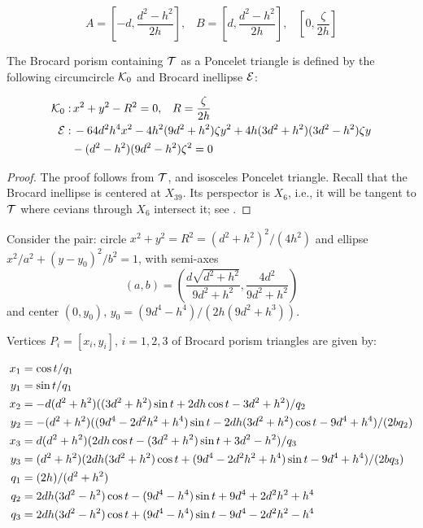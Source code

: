 \[A=\left[-d ,\frac{d^2-h^2}{2h}\right], \;\;\; B= \left[d,\frac{d^2-h^2}{2h}\right], \;\;\; \left[0 ,\frac{\zeta}{2h}\right] \]


\begin{proposition}\label{prop:pair_brocard}
The Brocard porism containing $\mathcal{T}$ as a Poncelet triangle is defined by the following circumcircle $\mathcal{K}_0$ and Brocard inellipse $\mathcal{E}$:

\begin{align*}
\mathcal{K}_0:&\, x^2+y^2-R^2=0, \;\;\; R=\frac{\zeta}{2h}\\
\mathcal{E}:&\, -64d^2  h^4  x^2-4  h^2  (9  d^2+h^2)  \zeta  y^2 +4  h  (3  d^2+h^2)  (3  d^2-h^2)  \zeta  y\\&-(d^2-h^2) (9d^2 -h^2) \zeta^2=0
\end{align*}
\end{proposition}

\begin{proof}
The proof follows from $\mathcal{T}$, and isosceles Poncelet triangle. Recall that the Brocard inellipse is centered at $X_{39}$. Its perspector is $X_6$, i.e., it will be tangent to $\mathcal{T}$ where cevians through $X_6$ intersect it; see \cite[Brocard inellipse]{mw}.
\end{proof}

Consider the pair: circle $x^2+y^2=R^2=(d^2+h^2)^2/(4h^2)$ and   ellipse
$x^2/a^2+(y-y_0)^2/b^2=1$, with  semi-axes
 \[  (a,b)=\left(\frac{d\sqrt{d^2+h^2}}{9d^2+h^2},\frac{4d^2}{9d^2+h^2}\right)
    \]
and center $(0,y_0)$,  $y_0=(9d^4 - h^4)/(2h(9d^2  +  h^3))$.

Vertices $P_i=[x_i,y_i]$, $i=1,2,3$ of Brocard porism triangles are given by:

{\small  
\begin{equation}
    \aligned
    x_1 &= \cos{t}/q_1\\
    y_1 &= \sin{t}/q_1 \\
    x_2 &= -d (d^2 + h^2) ((3 d^2 + h^2)\sin{t} + 2d h \cos{t}- 3 d^2 + h^2)/q_2 \\
    y_2&=-(d^2 + h^2) ((9 d^4 - 2 d^2 h^2 + h^4)\sin{t} - 2 d h (3 d^2 + h^2)\cos{t} - 9 d^4 + h^4)/(2 b q_2) \\
    x_3 &= d (d^2 + h^2) (2 d h \cos{t} - (3 d^2 + h^2) \sin{t} + 3 d^2 - h^2)/q_3\\
    y_3 &=(d^2 + h^2) (2d h (3 d^2 + h^2) \cos{t}+ (9 d^4 - 2 d^2 h^2 + h^4)\sin{t} - 9 d^4 + h^4)/(2 b q_3) \\
    q_1&=(2h)/(d^2+h^2)\\
    q_2&= 2 d h (3 d^2 - h^2)\cos{t} - (9 d^4 - h^4) \sin{t}  + 9 d^4 + 2 d^2 h^2 + h^4\\
    q_3&= 2 d h (3 d^2 - h^2)\cos{t} + (9 d^4 - h^4)\sin{t} - 9 d^4 - 2 d^2 h^2 - h^4
\endaligned
\label{eqn:03-vertices-brocard}
\end{equation}
}

